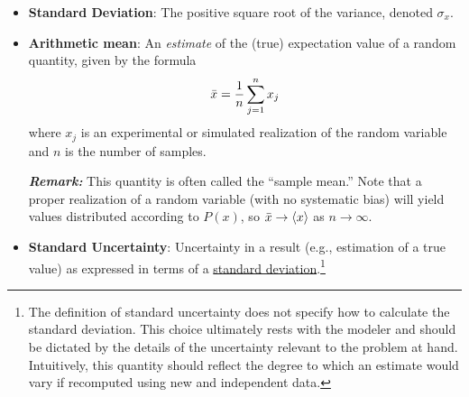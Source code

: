 \begin{itemize}
\item {\bf Standard Deviation}: The positive square root of the variance, denoted $\sigma_x$.\label{def:st_dev}

\item {\bf Arithmetic mean}: An \emph{estimate} of the (true) expectation value of a random quantity, given by the formula
  \begin{equation}
    \bar{x} = \dfrac{1}{n} \sum_{j=1}^{n} x_j \label{def:arith_mean}
  \end{equation}
  where $x_j$ is an experimental or simulated realization of the random variable and $n$ is the number of samples. 
\smallskip 

\textbf{\textit{Remark:}} This quantity is often called the ``sample mean.''
Note that a proper realization of a random variable (with no systematic bias) will yield values distributed according to $P(x)$, so $\bar{x} \rightarrow \langle x \rangle$ as $n \rightarrow \infty$.


\item {\bf Standard Uncertainty}: Uncertainty in a result (e.g., estimation of a true value) as expressed in terms of a \hyperref[def:st_dev]{standard deviation}.\footnote{The definition of standard uncertainty does not specify how to calculate the standard deviation. This choice ultimately rests with the modeler and should be dictated by the details of the uncertainty relevant to the problem at hand.  Intuitively, this quantity should reflect the degree to which an estimate would vary if recomputed using new and independent data.}
  \label{def:std_unc}


\end{itemize}
